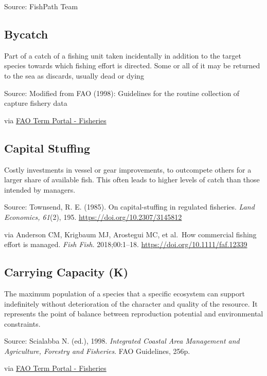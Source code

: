\documentclass[
  11pt,
]{book}
\begin{document}
Source: FishPath Team

\hypertarget{bycatch}{%
\subsection{Bycatch}\label{bycatch}}

Part of a catch of a fishing unit taken incidentally in addition to the target species towards which fishing effort is directed. Some or all of it may be returned to the sea as discards, usually dead or dying

Source: Modified from FAO (1998): Guidelines for the routine collection of capture fishery data

via \href{http://www.fao.org/fishery/glossary/en}{FAO Term Portal - Fisheries}

\hypertarget{capital-stuffing}{%
\subsection{Capital Stuffing}\label{capital-stuffing}}

Costly investments in vessel or gear improvements, to outcompete others for a larger share of available fish. This often leads to higher levels of catch than those intended by managers.

Source: Townsend, R. E. (1985). On capital-stuffing in regulated fisheries. \emph{Land
Economics, 61}(2), 195. \url{https://doi.org/10.2307/3145812}

via Anderson CM, Krigbaum MJ,
Arostegui MC, et al.~How commercial fishing effort is managed. \emph{Fish Fish}. 2018;00:1--18. \url{https://doi.org/10.1111/faf.12339}

\hypertarget{carrying-capacity-k}{%
\subsection{Carrying Capacity (K)}\label{carrying-capacity-k}}

The maximum population of a species that a specific ecosystem can support indefinitely without deterioration of the character and quality of the resource. It represents the point of balance between reproduction potential and environmental constraints.

Source: Scialabba N. (ed.), 1998. \emph{Integrated Coastal Area Management and Agriculture, Forestry and Fisheries}. FAO Guidelines, 256p.

via \href{http://www.fao.org/fishery/glossary/en}{FAO Term Portal - Fisheries}
\end{document}
